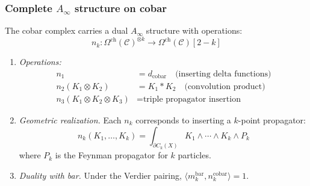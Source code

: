 \subsubsection{\texorpdfstring{Complete $A_\infty$ structure on cobar}{Complete A-infinity structure on cobar}}

\begin{theorem}\label{thm:cobar-ainfty-complete}
The cobar complex carries a dual $A_\infty$ structure with operations:
\[n_k: \Omega^{\mathrm{ch}}(\mathcal{C})^{\otimes k} \to \Omega^{\mathrm{ch}}(\mathcal{C})[2-k]\]

\begin{enumerate}
\item \emph{Operations:}
\begin{align}
n_1 &= d_{\mathrm{cobar}} \quad \text{(inserting delta functions)} \\
n_2(K_1 \otimes K_2) &= K_1 * K_2 \quad \text{(convolution product)} \\
n_3(K_1 \otimes K_2 \otimes K_3) &= \text{triple propagator insertion}
\end{align}

\item \emph{Geometric realization.} Each $n_k$ corresponds to inserting a $k$-point propagator:
\[n_k(K_1, \ldots, K_k) = \int_{\partial C_k(X)} K_1 \wedge \cdots \wedge K_k \wedge P_k\]
where $P_k$ is the Feynman propagator for $k$ particles.

\item \emph{Duality with bar.} Under the Verdier pairing,
$\langle m_k^{\mathrm{bar}}, n_k^{\mathrm{cobar}} \rangle = 1$.
\end{enumerate}
\end{theorem}

